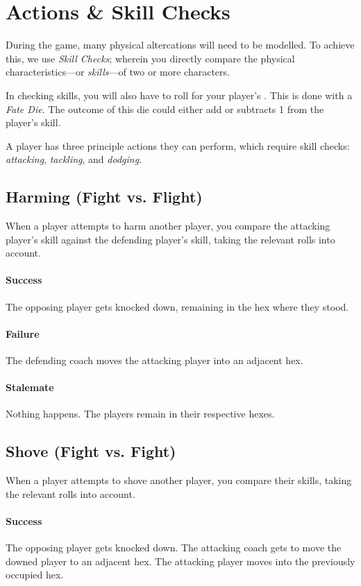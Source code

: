 \section{Actions \& Skill Checks}\label{skill-checks}
During the game, many physical altercations will need to be modelled.
To achieve this, we use \textit{Skill Checks}; wherein you directly compare the physical characteristics---or \textit{skills}---of two or more characters.

In checking skills, you will also have to roll for your player's \fate{}.
This is done with a \textit{Fate Die}.
The outcome of this die could either add or subtracts 1 from the player's skill.

A player has three principle actions they can perform, which require skill checks: \textit{attacking}, \textit{tackling}, and \textit{dodging}.

\subsection{Harming (Fight vs. Flight)}
When a player attempts to harm another player, you compare the attacking player's \fight{} skill against the defending player's \flight{} skill, taking the relevant \fate{} rolls into account.

\paragraph{Success}
The opposing player gets knocked down, remaining in the hex where they stood.
\paragraph{Failure}
The defending coach moves the attacking player into an adjacent hex.
\paragraph{Stalemate}
Nothing happens.
The players remain in their respective hexes.

\subsection{Shove (Fight vs. Fight)}
When a player attempts to shove another player, you compare their \fight{} skills, taking the relevant \fate{} rolls into account.

\paragraph{Success} 
The opposing player gets knocked down. 
The attacking coach gets to move the downed player to an adjacent hex.
The attacking player moves into the previously occupied hex.

